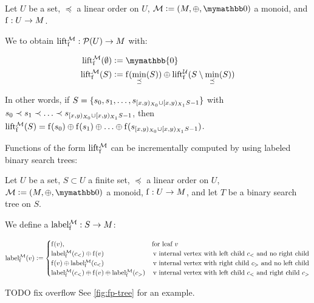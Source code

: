 \begin{definition}
\label{def-lift}
Let $U$ be a set, $\preceq$ a linear order on $U$, $\mathcal{M} \defeq (M, \groupaddsym, \neutraladd)$ a monoid, and ${\operatorname{f}}: {U} \rightarrow {M}$.

We  to obtain ${\operatorname{lift_{\operatorname{f}}^{\mathcal{M}}}}: {\mathcal{P}({U})} \rightarrow {M}$ with:

\begin{align*}
\lift{\f}{\mathcal{M}}(\emptyset) &\defeq \mymathbb{0}\\
\lift{\f}{\mathcal{M}}(S) &\defeq \f(\min_{\preceq}(S)) \oplus \lift{\f}{\mathcal{U}}(S \setminus \min_{\preceq}(S))\\
\end{align*}

In other words, if $S = \{s_0, s_1, \ldots, s_{[{x},{y})_{X_0} \cup [{x},{y})_{X_1}{S} - 1}\}$ with $s_0 \prec s_1 \prec \ldots \prec s_{[{x},{y})_{X_0} \cup [{x},{y})_{X_1}{S} - 1}$, then $\operatorname{lift_{\operatorname{f}}^{\mathcal{M}}}(S) = {\operatorname{f}(s_0)} \oplus {{\operatorname{f}(s_1)} \oplus{{\ldots} \oplus{\operatorname{f}(s_{[{x},{y})_{X_0} \cup [{x},{y})_{X_1}{S} - 1})}}}$.
\end{definition}

Functions of the form $\operatorname{lift_{\operatorname{f}}^{\mathcal{M}}}$ can be incrementally computed by using labeled binary search trees:

\begin{definition}
Let $U$ be a set, $S \subset U$ a finite set, $\preceq$ a linear order on $U$, $\mathcal{M} \defeq (M, \groupaddsym, \neutraladd)$ a monoid, ${\operatorname{f}}: {U} \rightarrow {M}$, and let $T$ be a binary search tree on $S$.

We define a  ${\operatorname{label_{\operatorname{f}}^{\mathcal{M}}}}: {S} \rightarrow {M}$:

  \[
   \operatorname{label_{\operatorname{f}}^{\mathcal{M}}}(v) \vcentcolon= \begin{cases}
\operatorname{f}(v), &  \text{for leaf $v$} \\
{\operatorname{label_{\operatorname{f}}^{\mathcal{M}}}(c_{<})} \oplus {\operatorname{f}(v)} & \, \text{v internal vertex with left child $c_{<}$ and no right child}\\
{\operatorname{f}(v)} \oplus {\operatorname{label_{\operatorname{f}}^{\mathcal{M}}}(c_{<})} & \, \text{v internal vertex with right child $c_{>}$ and no left child}\\
{\operatorname{label_{\operatorname{f}}^{\mathcal{M}}}(c_{<})} \oplus {{\operatorname{f}(v)} \oplus{\operatorname{label_{\operatorname{f}}^{\mathcal{M}}}(c_{>})}} & \, \text{v internal vertex with left child $c_{<}$ and right child $c_{>}$}
\end{cases}
  \]

TODO fix overflow
See \cref{fig:fp-tree} for an example.
\end{definition}

